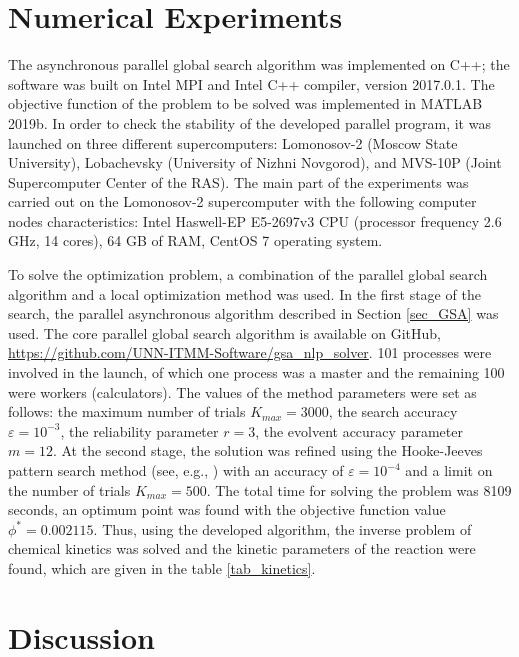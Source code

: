\documentclass[mathematics,article,submit,pdftex,moreauthors]{Definitions/mdpi}
\begin{document}
\section{Numerical Experiments}\label{sec_numexper}

The asynchronous parallel global search algorithm was implemented on C++; the software was built on Intel MPI and Intel C++ compiler, version 2017.0.1. The objective function of the problem to be solved was implemented in MATLAB 2019b.
In order to check the stability of the developed parallel program, it was launched on three different supercomputers: Lomonosov-2 (Moscow State University), Lobachevsky (University of Nizhni Novgorod), and MVS-10P (Joint Supercomputer Center of the RAS). The main part of the experiments was carried out on the Lomonosov-2 supercomputer with the following computer nodes characteristics: Intel Haswell-EP E5-2697v3 CPU (processor frequency 2.6 GHz, 14 cores), 64 GB of RAM, CentOS 7 operating system.

To solve the optimization problem, a combination of the parallel global search algorithm and a local optimization method was used. In the first stage of the search, 
\textcolor[rgb]{1,0,0}{the parallel asynchronous algorithm described in Section \ref{sec_GSA} was used. The core parallel global search algorithm is available on GitHub, \url{https://github.com/UNN-ITMM-Software/gsa_nlp_solver}.}
101 processes were involved in the launch, of which one process was a master and the remaining 100 were workers (calculators). The values of the method parameters were set as follows: the maximum number of trials $K_{max}=3000$, the search accuracy $\varepsilon=10^{-3}$, the reliability parameter $r=3$, the evolvent accuracy parameter $m=12$. At the second stage, the solution was refined
\textcolor[rgb]{1,0,0}{using the Hooke-Jeeves pattern search method (see, e.g., \cite{HookJeeves})}
with an accuracy of $\varepsilon=10^{-4}$ and a limit on the number of trials $K_{max}=500$.
The total time for solving the problem was 8109 seconds, an optimum point was found with the objective function value $\phi^* = 0.002115$. Thus, using the developed algorithm, the inverse problem of chemical kinetics was solved and the kinetic parameters of the reaction were found, which are given in the table \ref{tab_kinetics}. 

\section{Discussion}\label{sec_discussion}
\end{document}
